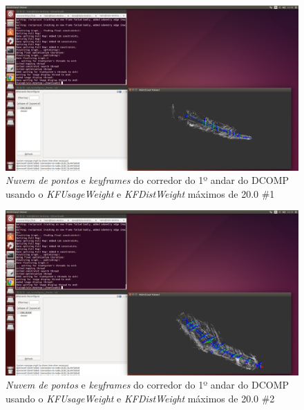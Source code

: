 \begin{figure}[H]
	\centering
		\includegraphics[width= \textwidth]{Imagens/figura3-40.png}
	\caption{\textit{Nuvem de pontos} e \textit{keyframes} do corredor do 1º andar do DCOMP usando o \textit{KFUsageWeight} e \textit{KFDistWeight} máximos de 20.0 \#1}
	\label{fig3:38}
\end{figure}

\begin{figure}[H]
	\centering
		\includegraphics[width= \textwidth]{Imagens/figura3-41.png}
	\caption{\textit{Nuvem de pontos} e \textit{keyframes} do corredor do 1º andar do DCOMP usando o \textit{KFUsageWeight} e \textit{KFDistWeight} máximos de 20.0 \#2}
	\label{fig3:39}
\end{figure}